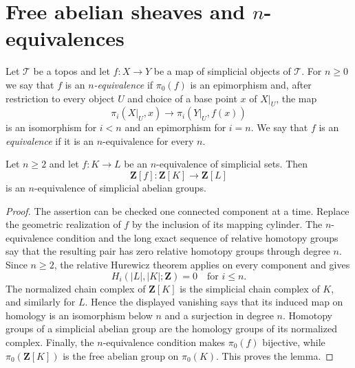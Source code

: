 
\section{Free abelian sheaves and $n$-equivalences}
\label{section-illusie-I-whitehead-free-abelian}

\begin{definition}
\label{definition-illusie-I-n-equivalence}
Let $\mathcal{T}$ be a topos and let $f : X \to Y$ be a map of
simplicial objects of $\mathcal{T}$. For $n \geq 0$ we say that $f$ is an
{\it $n$-equivalence} if $\pi_0(f)$ is an epimorphism and, after restriction
to every object $U$ and choice of a base point $x$ of $X|_U$, the map
$$
\pi_i(X|_U, x) \longrightarrow \pi_i(Y|_U, f(x))
$$
is an isomorphism for $i < n$ and an epimorphism for $i = n$.
We say that $f$ is an {\it equivalence} if it is an $n$-equivalence for
every $n$.
\end{definition}

\begin{lemma}
\label{lemma-illusie-I-relative-hurewicz-free-abelian}
Let $n \geq 2$ and let $f : K \to L$ be an $n$-equivalence of simplicial
sets. Then
$$
\mathbf{Z}[f] : \mathbf{Z}[K] \longrightarrow \mathbf{Z}[L]
$$
is an $n$-equivalence of simplicial abelian groups.
\end{lemma}

\begin{proof}
The assertion can be checked one connected component at a time. Replace the
geometric realization of $f$ by the inclusion of its mapping cylinder. The
$n$-equivalence condition and the long exact sequence of relative homotopy
groups say that the resulting pair has zero relative homotopy groups through
degree $n$. Since $n \geq 2$, the relative Hurewicz theorem applies on every
component and gives
$$
H_i(|L|, |K|; \mathbf{Z}) = 0 \quad\text{for }i \leq n.
$$
The normalized chain complex of $\mathbf{Z}[K]$ is the simplicial chain
complex of $K$, and similarly for $L$. Hence the displayed vanishing says
that its induced map on homology is an isomorphism below $n$ and a
surjection in degree $n$. Homotopy groups of a simplicial abelian group are
the homology groups of its normalized complex. Finally, the
$n$-equivalence condition makes $\pi_0(f)$ bijective, while
$\pi_0(\mathbf{Z}[K])$ is the free abelian group on $\pi_0(K)$. This proves
the lemma.
\end{proof}

